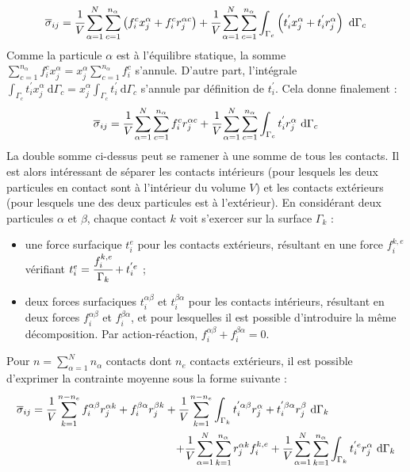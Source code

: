 \begin{equation}\label{annexe:contraintes_final_rj}
	\overline{\sigma}_{ij}
	= \cfrac{1}{V} \sum_{\alpha=1}^N \sum_{c=1}^{n_\alpha} \left( f_i^c x_j^\alpha + f_i^c r_j^{\alpha c} \right) + \cfrac{1}{V} \sum_{\alpha=1}^N \sum_{c=1}^{n_\alpha} \int_{\Gamma_c} \left( t_i^{'} x_j^\alpha + t_i^{'} r_j^\alpha \right)\ \mathrm{d} \Gamma_c
\end{equation}
Comme la particule $\alpha$ est à l'équilibre statique, la somme $\sum_{c=1}^{n_\alpha} f_i^c x_j^\alpha = x_j^\alpha \sum_{c=1}^{n_\alpha} f_i^c$ s'annule. D'autre part, l'intégrale $\int_{\Gamma_c} t_i^{'} x_j^\alpha\ \mathrm{d} \Gamma_c = x_j^\alpha \int_{\Gamma_c} t_i^{'}\ \mathrm{d} \Gamma_c$ s'annule par définition de $t_i^{'}$. Cela donne finalement :
\begin{equation}\label{annexe:contraintes_final_rj_2}
	\overline{\sigma}_{ij}
	= \cfrac{1}{V} \sum_{\alpha=1}^N \sum_{c=1}^{n_\alpha} f_i^c r_j^{\alpha c} + \cfrac{1}{V} \sum_{\alpha=1}^N \sum_{c=1}^{n_\alpha} \int_{\Gamma_c} t_i^{'} r_j^\alpha\ \mathrm{d} \Gamma_c
\end{equation}
La double somme ci-dessus peut se ramener à une somme de tous les contacts. Il est alors intéressant de séparer les contacts intérieurs (pour lesquels les deux particules en contact sont à l'intérieur du volume $V$) et les contacts extérieurs (pour lesquels une des deux particules est à l'extérieur). En considérant deux particules $\alpha$ et $\beta$, chaque contact $k$ voit s'exercer sur la surface $\Gamma_k$ :
\begin{itemize}
	\item une force surfacique $t_i^e$ pour les contacts extérieurs, résultant en une force $f_i^{k,e}$ vérifiant $t_i^e = \cfrac{f_i^{k,e}}{\Gamma_k} + t_i^{'e}$ ;
	\item deux forces surfaciques $t_i^{\alpha\beta}$ et $t_i^{\beta\alpha}$ pour les contacts intérieurs, résultant en deux forces $f_i^{\alpha\beta}$ et $f_i^{\beta\alpha}$, et pour lesquelles il est possible d'introduire la même décomposition. Par action-réaction, $f_i^{\alpha\beta} + f_i^{\beta\alpha} = 0$.
\end{itemize}
Pour $n = \sum_{\alpha=1}^N n_\alpha$ contacts dont $n_e$ contacts extérieurs, il est possible d'exprimer la contrainte moyenne sous la forme suivante :
\begin{equation}\label{annexe:sigma_moyen_forces_exterieures}
	\begin{split}
	\overline{\sigma}_{ij}
	= \cfrac{1}{V} \sum_{k=1}^{n-n_e} f_i^{\alpha\beta} r_j^{\alpha k} + f_i^{\beta\alpha} r_j^{\beta k}
	+ \cfrac{1}{V} \sum_{k=1}^{n-n_e} \int_{\Gamma_k} t_i^{'\alpha\beta} r_j^\alpha + t_i^{'\beta\alpha} r_j^\beta\ \mathrm{d} \Gamma_k\qquad\qquad\qquad \\
	+ \cfrac{1}{V} \sum_{\alpha=1}^N \sum_{k=1}^{n_\alpha} r_j^{\alpha k} f_i^{k,e}
	+ \cfrac{1}{V} \sum_{\alpha=1}^N \sum_{k=1}^{n_\alpha} \int_{\Gamma_k} t_i^{'e} r_j^\alpha\ \mathrm{d} \Gamma_k
	\end{split}
\end{equation}
